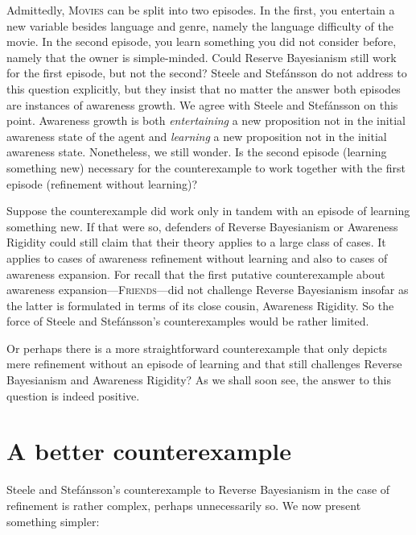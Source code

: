 \documentclass[
  11pt,
  dvipsnames,enabledeprecatedfontcommands]{scrartcl}
\begin{document}
\noindent  Admittedly, \textsc{Movies} can be split into two episodes.
In the first, you entertain a new variable besides language and genre,
namely the language difficulty of the movie. In the second episode, you
learn something you did not consider before, namely that the owner is
simple-minded. Could Reserve Bayesianism still work for the first
episode, but not the second? Steele and Stefánsson do not address to
this question explicitly, but they insist that no matter the answer both
episodes are instances of awareness growth. We agree with Steele and
Stefánsson on this point. Awareness growth is both \textit{entertaining}
a new proposition not in the initial awareness state of the agent and
\textit{learning} a new proposition not in the initial awareness state.
Nonetheless, we still wonder. Is the second episode (learning something
new) necessary for the counterexample to work together with the first
episode (refinement without learning)?

Suppose the counterexample did work only in tandem with an episode of
learning something new. If that were so, defenders of Reverse
Bayesianism or Awareness Rigidity could still claim that their theory
applies to a large class of cases. It applies to cases of awareness
refinement without learning and also to cases of awareness expansion.
For recall that the first putative counterexample about awareness
expansion---\textsc{Friends}---did not challenge Reverse Bayesianism
insofar as the latter is formulated in terms of its close cousin,
Awareness Rigidity. So the force of Steele and Stefánsson's
counterexamples would be rather limited.

Or perhaps there is a more straightforward counterexample that only
depicts mere refinement without an episode of learning and that still
challenges Reverse Bayesianism and Awareness Rigidity? As we shall soon
see, the answer to this question is indeed positive.

\hypertarget{a-better-counterexample}{%
\section{A better counterexample}\label{a-better-counterexample}}

\label{sec:better}

Steele and Stefánsson's counterexample to Reverse Bayesianism in the
case of refinement is rather complex, perhaps unnecessarily so. We now
present something simpler:
\end{document}
